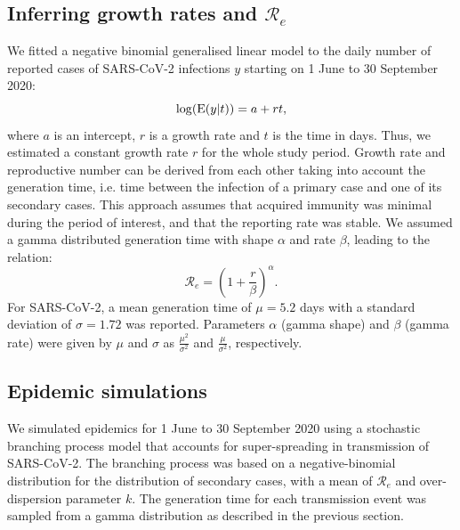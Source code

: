\documentclass[10pt, a4paper, twoside]{article}
\begin{document}
\begin{multicols}{2}
\subsection{Inferring growth rates and $\mathcal{R}_e$}\label{marker}
We fitted a negative binomial generalised linear model to the daily number of reported cases of SARS-CoV-2 infections $y$ starting on 1 June to 30 September 2020:
\begin{equation}
	\log(\text E(y|t)) = a + r t,
\end{equation}
where $a$ is an intercept, $r$ is a growth rate and $t$ is the time in days.
Thus, we estimated a constant growth rate $r$ for the whole study period.
Growth rate and reproductive number can be derived from each other taking into account the generation time, i.e. time between the infection of a primary case and one of its secondary cases.\cite{wallinga_how_2007,krauer_heterogeneity_2016,svensson_note_2007}
This approach assumes that acquired immunity was minimal during the period of interest, and that  the reporting rate was stable.
We assumed a gamma distributed generation time with shape $\alpha$ and rate $\beta$, leading to the relation:
\begin{equation}
	\mathcal{R}_e = (1 + \frac{r}{\beta} )^\alpha.
\end{equation}
For SARS-CoV-2, a mean generation time of $\mu= 5.2$ days with a standard deviation of $\sigma = 1.72$ was reported.\cite{ganyani_estimating_2020}
Parameters $\alpha$ (gamma shape) and $\beta$  (gamma rate) were given by $\mu$ and $\sigma$ as $\frac{\mu^2}{\sigma^2 }$ and $\frac{\mu}{\sigma^2}$, respectively.

\subsection{Epidemic simulations}
We simulated epidemics for 1 June to 30 September 2020 using a stochastic branching process model that accounts for super-spreading in transmission of SARS-CoV-2.\cite{riou_pattern_2020}
The branching process was based on a negative-binomial distribution for the distribution of secondary cases, with a mean of $\mathcal{R}_e$ and over-dispersion parameter $k$.
The generation time for each transmission event was sampled from a gamma distribution as described in the previous section.


\end{multicols}
\end{document}

